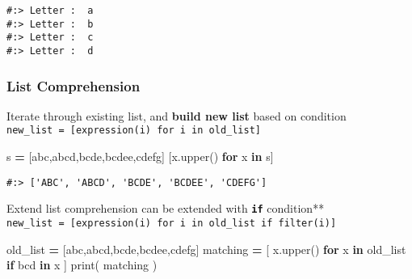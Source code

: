 \documentclass[
]{book}
\newenvironment{Shaded}{\begin{snugshade}}{\end{snugshade}}
\newcommand{\BuiltInTok}[1]{#1}
\newcommand{\ControlFlowTok}[1]{\textcolor[rgb]{0.27,0.27,0.27}{\textbf{#1}}}
\newcommand{\KeywordTok}[1]{\textcolor[rgb]{0.27,0.27,0.27}{\textbf{#1}}}
\newcommand{\NormalTok}[1]{#1}
\newcommand{\OperatorTok}[1]{\textcolor[rgb]{0.43,0.43,0.43}{\textbf{#1}}}
\newcommand{\StringTok}[1]{\textcolor[rgb]{0.5,0.5,0.5}{#1}}
\begin{document}
\begin{verbatim}
#:> Letter :  a
#:> Letter :  b
#:> Letter :  c
#:> Letter :  d
\end{verbatim}

\hypertarget{list-comprehension-1}{%
\subsubsection{List Comprehension}\label{list-comprehension-1}}

Iterate through existing list, and \textbf{build new list} based on condition\\
\texttt{new\_list\ =\ {[}expression(i)\ for\ i\ in\ old\_list{]}}

\begin{Shaded}
\begin{Highlighting}[]
\NormalTok{s }\OperatorTok{=}\NormalTok{ [}\StringTok{\textquotesingle{}abc\textquotesingle{}}\NormalTok{,}\StringTok{\textquotesingle{}abcd\textquotesingle{}}\NormalTok{,}\StringTok{\textquotesingle{}bcde\textquotesingle{}}\NormalTok{,}\StringTok{\textquotesingle{}bcdee\textquotesingle{}}\NormalTok{,}\StringTok{\textquotesingle{}cdefg\textquotesingle{}}\NormalTok{]}
\NormalTok{[x.upper() }\ControlFlowTok{for}\NormalTok{ x }\KeywordTok{in}\NormalTok{ s]}
\end{Highlighting}
\end{Shaded}

\begin{verbatim}
#:> ['ABC', 'ABCD', 'BCDE', 'BCDEE', 'CDEFG']
\end{verbatim}

Extend list comprehension can be extended with \textbf{\texttt{if}} condition**\\
\texttt{new\_list\ =\ {[}expression(i)\ for\ i\ in\ old\_list\ if\ filter(i){]}}

\begin{Shaded}
\begin{Highlighting}[]
\NormalTok{old\_list    }\OperatorTok{=}\NormalTok{ [}\StringTok{\textquotesingle{}abc\textquotesingle{}}\NormalTok{,}\StringTok{\textquotesingle{}abcd\textquotesingle{}}\NormalTok{,}\StringTok{\textquotesingle{}bcde\textquotesingle{}}\NormalTok{,}\StringTok{\textquotesingle{}bcdee\textquotesingle{}}\NormalTok{,}\StringTok{\textquotesingle{}cdefg\textquotesingle{}}\NormalTok{]}
\NormalTok{matching }\OperatorTok{=}\NormalTok{ [ x.upper() }\ControlFlowTok{for}\NormalTok{ x }\KeywordTok{in}\NormalTok{ old\_list }\ControlFlowTok{if} \StringTok{\textquotesingle{}bcd\textquotesingle{}} \KeywordTok{in}\NormalTok{ x ]}
\BuiltInTok{print}\NormalTok{( matching )}
\end{Highlighting}
\end{Shaded}
\end{document}
